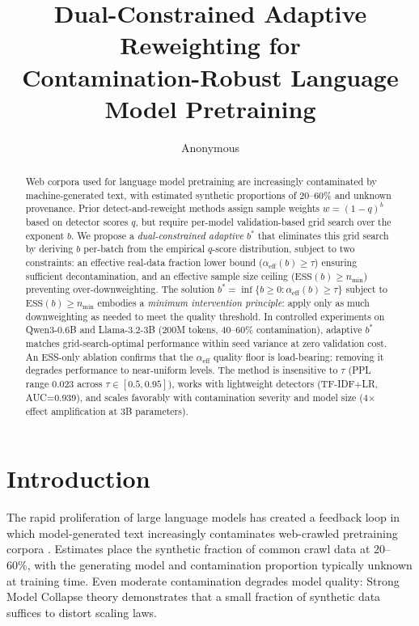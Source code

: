 \documentclass[11pt,a4paper]{article}
\title{Dual-Constrained Adaptive Reweighting for\\Contamination-Robust Language Model Pretraining}
\author{Anonymous}
\newcommand{\bstar}{b^{*}}
\newcommand{\aeff}{\alpha_{\mathrm{eff}}}
\newcommand{\nmin}{n_{\min}}
\begin{document}
\maketitle

\begin{abstract}
Web corpora used for language model pretraining are increasingly contaminated by machine-generated text, with estimated synthetic proportions of 20--60\% and unknown provenance.
Prior detect-and-reweight methods assign sample weights $w=(1-q)^b$ based on detector scores $q$, but require per-model validation-based grid search over the exponent $b$.
We propose a \emph{dual-constrained adaptive} $\bstar$ that eliminates this grid search by deriving $b$ per-batch from the empirical $q$-score distribution, subject to two constraints: an effective real-data fraction lower bound ($\aeff(b) \geq \tau$) ensuring sufficient decontamination, and an effective sample size ceiling ($\mathrm{ESS}(b) \geq \nmin$) preventing over-downweighting.
The solution $\bstar = \inf\{b \geq 0 : \aeff(b) \geq \tau\}$ subject to $\mathrm{ESS}(b) \geq \nmin$ embodies a \emph{minimum intervention principle}: apply only as much downweighting as needed to meet the quality threshold.
In controlled experiments on Qwen3-0.6B and Llama-3.2-3B (200M tokens, 40--60\% contamination), adaptive $\bstar$ matches grid-search-optimal performance within seed variance at zero validation cost.
An ESS-only ablation confirms that the $\aeff$ quality floor is load-bearing: removing it degrades performance to near-uniform levels.
The method is insensitive to $\tau$ (PPL range 0.023 across $\tau \in [0.5, 0.95]$), works with lightweight detectors (TF-IDF+LR, AUC=0.939), and scales favorably with contamination severity and model size (4$\times$ effect amplification at 3B parameters).
\end{abstract}

\section{Introduction}
\label{sec:intro}

The rapid proliferation of large language models has created a feedback loop in which model-generated text increasingly contaminates web-crawled pretraining corpora \cite{shumailov2024model}.
Estimates place the synthetic fraction of common crawl data at 20--60\%, with the generating model and contamination proportion typically unknown at training time.
Even moderate contamination degrades model quality: Strong Model Collapse theory demonstrates that a small fraction of synthetic data suffices to distort scaling laws.
\end{document}
